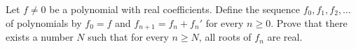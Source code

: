Let $ f \ne 0$ be a polynomial with real coefficients. Define the sequence $ f_{0}, f_{1}, f_{2}, \ldots$ of polynomials by $ f_{0}= f$ and $ f_{n+1}= f_{n}+f_{n}'$ for every $ n \ge 0$. Prove that there exists a number $ N$ such that for every $ n \ge N$, all roots of $ f_{n}$ are real.